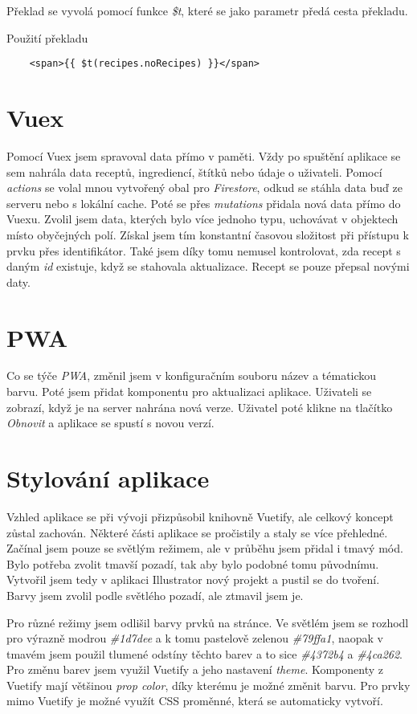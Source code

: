 Překlad se vyvolá pomocí funkce \emph{\$t}, které se jako parametr předá cesta překladu.

\begin{listing}[h]
    \caption{Použití překladu}
    \begin{verbatim}
    <span>{{ $t(recipes.noRecipes) }}</span>
    \end{verbatim}
\end{listing}

\section{Vuex}
Pomocí Vuex jsem spravoval data přímo v paměti. Vždy po spuštění aplikace se sem nahrála data receptů, ingrediencí, štítků
nebo údaje o uživateli. Pomocí \emph{actions} se volal mnou vytvořený obal pro \emph{Firestore}, odkud se stáhla data buď ze serveru
nebo s lokální cache. Poté se přes \emph{mutations} přidala nová data přímo do Vuexu. Zvolil jsem data, kterých bylo více jednoho typu,
uchovávat v objektech místo obyčejných polí. Získal jsem tím konstantní časovou složitost při přístupu k prvku přes identifikátor. Také
jsem díky tomu nemusel kontrolovat, zda recept s daným \emph{id} existuje, když se stahovala aktualizace. Recept se pouze přepsal novými
daty.

\section{PWA}
Co se týče \emph{PWA}, změnil jsem v konfiguračním souboru název a tématickou barvu. Poté jsem přidat komponentu pro aktualizaci aplikace.
Uživateli se zobrazí, když je na server nahrána nová verze. Uživatel poté klikne na tlačítko \emph{Obnovit} a aplikace se spustí s novou verzí.

\section{Stylování aplikace}
Vzhled aplikace se při vývoji přizpůsobil knihovně Vuetify, ale celkový koncept zůstal zachován. Některé části aplikace
se pročistily a staly se více přehledné. Začínal jsem pouze se světlým režimem, ale v průběhu jsem přidal i tmavý mód.
Bylo potřeba zvolit tmavší pozadí, tak aby bylo podobné tomu původnímu. Vytvořil jsem tedy v aplikaci Illustrator nový projekt
a pustil se do tvoření. Barvy jsem zvolil podle světlého pozadí, ale ztmavil jsem je.

Pro různé režimy jsem odlišil barvy prvků na stránce. Ve světlém jsem se rozhodl pro výrazně modrou \emph{\#1d7dee} a k tomu
pastelově zelenou \emph{\#79ffa1}, naopak v tmavém jsem použil tlumené odstíny těchto barev a to sice \emph{\#4372b4} a \emph{\#4ca262}.
Pro změnu barev jsem využil Vuetify a jeho nastavení \emph{theme}. Komponenty z Vuetify mají většinou \emph{prop color}, díky
kterému je možné změnit barvu. Pro prvky mimo Vuetify je možné využít CSS proměnné, která se automaticky vytvoří.

